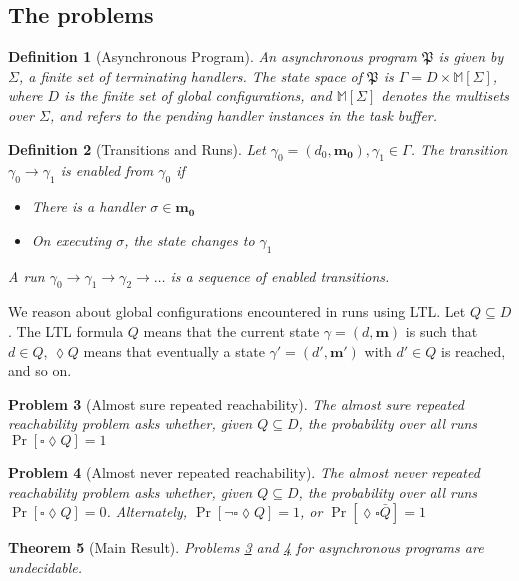 \documentclass{article}
\newtheorem{definition}{Definition}[section]
\newtheorem{problem}[definition]{Problem}
\newtheorem{theorem}[definition]{Theorem}
\theoremstyle{remark}
\newcommand{\program}{\mathfrak{P}}
\newcommand{\multisets}{\mathbb{M}}
\begin{document}
\subsection{The problems}
\begin{definition}[Asynchronous Program]
An asynchronous program $\program$ is given by $\Sigma$, a finite set of terminating handlers. The state space of $\program$ is $\Gamma = D \times \multisets[\Sigma]$, where $D$ is the finite set of global configurations, and $\multisets[\Sigma]$ denotes the multisets over $\Sigma$, and refers to the pending handler instances in the task buffer.
\end{definition}

\begin{definition}[Transitions and Runs]
Let $\gamma_0 = (d_0, \mathbf{m_0}), \gamma_1 \in \Gamma$. The transition $\gamma_0 \rightarrow \gamma_1$ is enabled from $\gamma_0$ if
\begin{itemize}
\item There is a handler $\sigma \in \mathbf{m_0}$
\item On executing $\sigma$, the state changes to $\gamma_1$
\end{itemize}
A run $\gamma_0 \rightarrow \gamma_1 \rightarrow \gamma_2 \rightarrow \dots$ is a sequence of enabled transitions.
\end{definition}

We reason about global configurations encountered in runs using LTL. Let $Q \subseteq D$. The LTL formula $Q$ means that the current state $\gamma = (d, \mathbf{m})$ is such that $d \in Q$, $\lozenge Q$ means that eventually a state $\gamma' = (d', \mathbf{m'})$ with $d' \in Q$ is reached, and so on.

\begin{problem}[Almost sure repeated reachability]
\label{almostsure}
The almost sure repeated reachability problem asks whether, given $Q \subseteq D$, the probability over all runs $\Pr[\square \lozenge Q] = 1$
\end{problem}

\begin{problem}[Almost never repeated reachability]
\label{almostnever}
The almost never repeated reachability problem asks whether, given $Q \subseteq D$, the probability over all runs $\Pr[\square \lozenge Q] = 0$. Alternately, $\Pr[\neg \square \lozenge Q] = 1$, or $\Pr[\lozenge \square \bar{Q}] = 1$
\end{problem}

\begin{theorem}[Main Result]
Problems \ref{almostsure} and \ref{almostnever} for asynchronous programs are undecidable.
\end{theorem}
\end{document}
